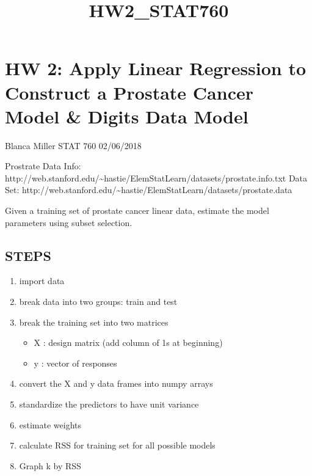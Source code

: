 \documentclass[11pt]{article}
\title{HW2\_STAT760}
\providecommand{\tightlist}{%
      \setlength{\itemsep}{0pt}\setlength{\parskip}{0pt}}
\begin{document}
    
    
    \maketitle
    
    

    
    \section{HW 2: Apply Linear Regression to Construct a Prostate Cancer
Model \& Digits Data
Model}\label{hw-2-apply-linear-regression-to-construct-a-prostate-cancer-model-digits-data-model}

    Blanca Miller STAT 760 02/06/2018

Prostrate Data Info:
http://web.stanford.edu/\textasciitilde{}hastie/ElemStatLearn/datasets/prostate.info.txt
Data Set:
http://web.stanford.edu/\textasciitilde{}hastie/ElemStatLearn/datasets/prostate.data

Given a training set of prostate cancer linear data, estimate the model
parameters using subset selection.

\subsection{STEPS}\label{steps}

\begin{enumerate}
\def\labelenumi{\arabic{enumi}.}
\tightlist
\item
  import data
\item
  break data into two groups: train and test
\item
  break the training set into two matrices

  \begin{itemize}
  \tightlist
  \item
    X : design matrix (add column of 1s at beginning)
  \item
    y : vector of responses
  \end{itemize}
\item
  convert the X and y data frames into numpy arrays
\item
  standardize the predictors to have unit variance
\item
  estimate weights
\item
  calculate RSS for training set for all possible models
\item
  Graph k by RSS
\end{enumerate}
\end{document}
